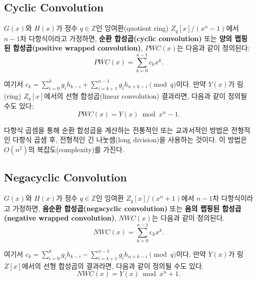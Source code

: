 \subsection{Cyclic Convolution}

\begin{tcolorbox}[colback=white, boxrule=0.7pt, sharp corners]
\begin{definition}
$G(x)$와 $H(x)$가 정수 $q \in \mathbb{Z}$인 잉여환(quotient ring) $Z_q[x]/(x^n - 1)$에서 $n-1$차 다항식이라고 가정하면, \textbf{순환 합성곱(cyclic convolution)} 또는 \textbf{양의 랩핑된 합성곱(positive wrapped convolution)}, $PWC(x)$는 다음과 같이 정의된다:
\begin{equation}
    PWC(x) = \sum_{k=0}^{n-1} c_k x^k.
\end{equation}

여기서 $c_k = \sum_{i=0}^k g_i h_{k-i} + \sum_{i=k+1}^{n-1} g_i h_{n+k-i} \pmod q$이다. 만약 $Y(x)$가 링(ring) $Z_q[x]$에서의 선형 합성곱(linear convolution) 결과라면, 다음과 같이 정의될 수도 있다:
\begin{equation}
    PWC(x) = Y(x) \bmod{x^n - 1}.
\end{equation}
\end{definition}
\end{tcolorbox}


다항식 곱셈을 통해 순환 합성곱을 계산하는 전통적인 또는 교과서적인 방법은 전형적인 다항식 곱셈 후, 전형적인 긴 나눗셈(long division)을 사용하는 것이다. 이 방법은 $O(n^2)$의 복잡도(complexity)를 가진다.

\subsection{Negacyclic Convolution}

\begin{tcolorbox}[colback=white, boxrule=0.7pt, sharp corners]
\begin{definition}
$G(x)$와 $H(x)$가 정수 $q \in \mathbb{Z}$인 잉여환 $Z_q[x]/(x^n + 1)$에서 $n-1$차 다항식이라고 가정하면, \textbf{음순환 합성곱(negacyclic convolution)} 또는 \textbf{음의 랩핑된 합성곱(negative wrapped convolution)}, $NWC(x)$는 다음과 같이 정의된다.
\begin{equation}
    NWC(x) = \sum_{k=0}^{n-1} c_k x^k.
\end{equation}

여기서 $c_k = \sum_{i=0}^k g_i h_{k-i} - \sum_{i=k+1}^{n-1} g_i h_{n+k-i} \pmod q$이다. 만약 $Y(x)$가 링 $Z[x]$에서의 선형 합성곱의 결과라면, 다음과 같이 정의될 수도 있다.
\begin{equation}
    NWC(x) = Y(x) \bmod{x^n + 1}.
\end{equation}
\end{definition}
\end{tcolorbox}

